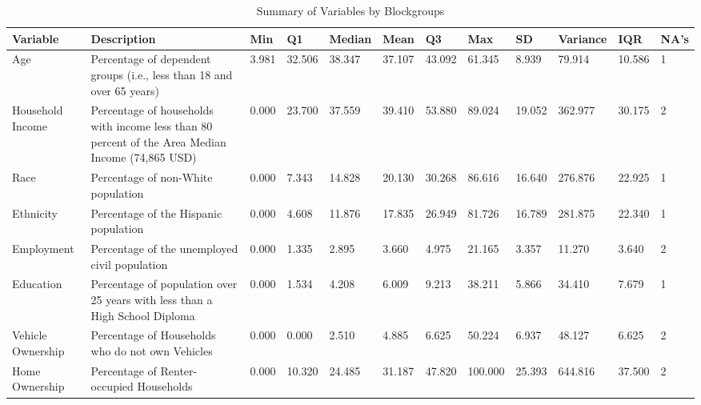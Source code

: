 \documentclass[numbered]{trbunofficial}
\begin{document}
\begin{table}[!ht]
	\caption{Summary of Variables by Blockgroups}\label{tab:versions}
        \begin{small}
	\begin{center}
		\begin{tabular}{p{0.5in}|p{1.1in}|p{0.2in}|p{0.3in}|p{0.3in}|p{0.3in}|p{0.3in}|p{0.3in}|p{0.3in}|p{0.4in}|p{0.3in}|p{0.2in}}
            \hline
            \textbf{Variable} & \textbf{Description} & \textbf{Min} & \textbf{Q1} & \textbf{Median} & \textbf{Mean} & \textbf{Q3} & \textbf{Max} & \textbf{SD} & \textbf{Variance} & \textbf{IQR} & \textbf{NA's} \\\hline
                Age & Percentage of dependent groups (i.e., less than 18 and over 65 years) & 3.981 & 32.506 & 38.347 & 37.107 & 43.092 & 61.345 & 8.939 & 79.914 & 10.586 & 1\\
                Household Income & Percentage of households with income less than 80 percent of the Area Median Income (74,865 USD) & 0.000 & 23.700 & 37.559 & 39.410 & 53.880 & 89.024 & 19.052 & 362.977 & 30.175 & 2\\
                Race & Percentage of non-White population & 0.000 & 7.343 & 14.828 & 20.130 & 30.268 & 86.616 & 16.640 & 276.876 & 22.925 & 1\\
                Ethnicity & Percentage of the Hispanic population & 0.000 & 4.608 & 11.876 & 17.835 & 26.949 & 81.726 & 16.789 & 281.875 & 22.340 & 1\\
                Employment & Percentage of the unemployed civil population & 0.000 & 1.335 & 2.895 & 3.660 & 4.975 & 21.165 & 3.357 & 11.270 & 3.640 & 2\\
                Education & Percentage of population over 25 years with less than a High School Diploma & 0.000 & 1.534 & 4.208 & 6.009 & 9.213 & 38.211 & 5.866 & 34.410 & 7.679 & 1\\
                Vehicle Ownership & Percentage of Households who do not own Vehicles & 0.000 & 0.000 & 2.510 & 4.885 & 6.625 & 50.224 & 6.937 & 48.127 & 6.625 & 2\\
                Home Ownership & Percentage of Renter-occupied Households & 0.000 & 10.320 & 24.485 & 31.187 & 47.820 & 100.000 & 25.393 & 644.816 & 37.500 & 2
                \\\hline
		\end{tabular}
	\end{center}      
        \end{small}
\end{table}
\end{document}
